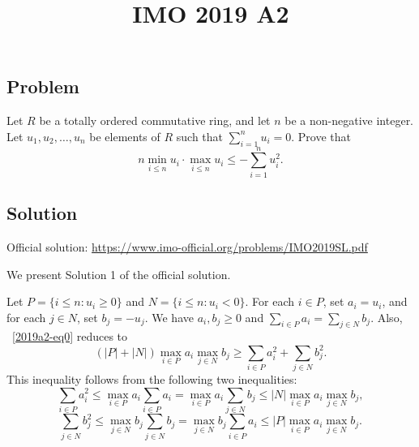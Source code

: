 \documentclass{article}
\title{IMO 2019 A2}
\author{}
\date{}
\begin{document}
\maketitle



\subsection*{Problem}

Let $R$ be a totally ordered commutative ring, and let $n$ be a non-negative integer.
Let $u_1, u_2, \ldots, u_n$ be elements of $R$ such that $\displaystyle \sum_{i = 1}^n u_i = 0$.
Prove that
\[ n \min_{i \leq n} u_i \cdot \max_{i \leq n} u_i \leq -\sum_{i = 1}^n u_i^2. \tag{*}\label{2019a2-eq0} \]



\subsection*{Solution}

Official solution: \url{https://www.imo-official.org/problems/IMO2019SL.pdf}

We present Solution 1 of the official solution.

Let $P = \{i \leq n : u_i \geq 0\}$ and $N = \{i \leq n : u_i < 0\}$.
For each $i \in P$, set $a_i = u_i$, and for each $j \in N$, set $b_j = -u_j$.
We have $a_i, b_j \geq 0$ and $\displaystyle \sum_{i \in P} a_i = \sum_{j \in N} b_j$.
Also, ~\eqref{2019a2-eq0} reduces to
\[ (|P| + |N|) \max_{i \in P} a_i \max_{j \in N} b_j \geq \sum_{i \in P} a_i^2 + \sum_{j \in N} b_j^2. \]
This inequality follows from the following two inequalities:
\[ \sum_{i \in P} a_i^2 \leq \max_{i \in P} a_i \sum_{i \in P} a_i = \max_{i \in P} a_i \sum_{j \in N} b_j \leq |N| \max_{i \in P} a_i \max_{j \in N} b_j, \]
\[ \sum_{j \in N} b_j^2 \leq \max_{j \in N} b_j \sum_{j \in N} b_j = \max_{j \in N} b_j \sum_{i \in P} a_i \leq |P| \max_{i \in P} a_i \max_{j \in N} b_j. \]
\end{document}
